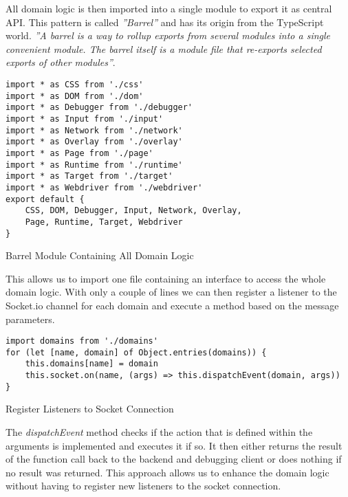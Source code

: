 All domain logic is then imported into a single module to export it as central API. This pattern is called
\textit{''Barrel''} and has its origin from the TypeScript world. \textit{''A barrel is a way to rollup
exports from several modules into a single convenient module. The barrel itself is a module file that
re-exports selected exports of other modules''}\cite{barrel}.

\begin{listing}[H]
\begin{verbatim}
import * as CSS from './css'
import * as DOM from './dom'
import * as Debugger from './debugger'
import * as Input from './input'
import * as Network from './network'
import * as Overlay from './overlay'
import * as Page from './page'
import * as Runtime from './runtime'
import * as Target from './target'
import * as Webdriver from './webdriver'
export default {
    CSS, DOM, Debugger, Input, Network, Overlay,
    Page, Runtime, Target, Webdriver
}
\end{verbatim}
\caption{Barrel Module Containing All Domain Logic}
\label{lst:barrel}
\end{listing}

This allows us to import one file containing an interface to access the whole domain logic. With only a
couple of lines we can then register a listener to the Socket.io channel for each domain and execute
a method based on the message parameters.

\begin{listing}[H]
\begin{verbatim}
import domains from './domains'
for (let [name, domain] of Object.entries(domains)) {
    this.domains[name] = domain
    this.socket.on(name, (args) => this.dispatchEvent(domain, args))
}
\end{verbatim}
\caption{Register Listeners to Socket Connection}
\label{lst:barrel}
\end{listing}

The \textit{dispatchEvent} method checks if the action that is defined within the arguments is implemented
and executes it if so. It then either returns the result of the function call back to the backend and
debugging client or does nothing if no result was returned. This approach allows us to enhance the domain
logic without having to register new listeners to the socket connection.

